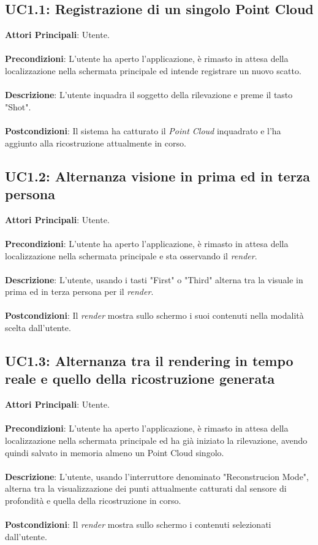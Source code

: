 \subsection{UC1.1: Registrazione di un singolo Point Cloud}
\textbf{Attori Principali}: Utente.
\\\\ \textbf{Precondizioni}:  L'utente ha aperto l'applicazione, è rimasto in attesa della localizzazione nella schermata principale ed intende registrare un nuovo scatto.
\\\\ \textbf{Descrizione}: L'utente inquadra il soggetto della rilevazione e preme il tasto "Shot".
\\\\ \textbf{Postcondizioni}: Il sistema ha catturato il \emph{Point Cloud} inquadrato e l'ha aggiunto alla ricostruzione attualmente in corso.

\subsection{UC1.2: Alternanza visione in prima ed in terza persona}
\textbf{Attori Principali}: Utente.
\\\\ \textbf{Precondizioni}: L'utente ha aperto l'applicazione, è rimasto in attesa della localizzazione nella schermata principale e sta osservando il \emph{render}.
\\\\ \textbf{Descrizione}: L'utente, usando i tasti "First" o "Third" alterna tra la visuale in prima ed in terza persona per il \emph{render}.
\\\\ \textbf{Postcondizioni}: Il \emph{render} mostra sullo schermo i suoi contenuti nella modalità scelta dall'utente.

\subsection{UC1.3: Alternanza tra il rendering in tempo reale e quello della ricostruzione generata}
\textbf{Attori Principali}: Utente.
\\\\ \textbf{Precondizioni}: L'utente ha aperto l'applicazione, è rimasto in attesa della localizzazione nella schermata principale ed ha già iniziato la rilevazione, avendo quindi salvato in memoria almeno un Point Cloud singolo.
\\\\ \textbf{Descrizione}: L'utente, usando l'interruttore denominato "Reconstrucion Mode", alterna tra la visualizzazione dei punti attualmente catturati dal sensore di profondità e quella della ricostruzione in corso.
\\\\ \textbf{Postcondizioni}: Il \emph{render} mostra sullo schermo i contenuti selezionati dall'utente.

